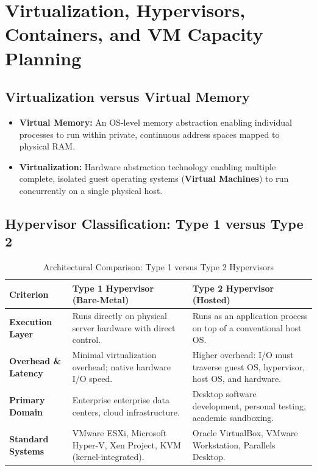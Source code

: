 \section{Virtualization, Hypervisors, Containers, and VM Capacity Planning}
\label{sec:os_virtualization_capacity}

\subsection{Virtualization versus Virtual Memory}
\begin{itemize}
    \item \textbf{Virtual Memory:} An OS-level memory abstraction enabling individual processes to run within private, continuous address spaces mapped to physical RAM.
    \item \textbf{Virtualization:} Hardware abstraction technology enabling multiple complete, isolated guest operating systems (\textbf{Virtual Machines}) to run concurrently on a single physical host.
\end{itemize}

\subsection{Hypervisor Classification: Type 1 versus Type 2}
\begin{table}[htbp]
\centering
\small
\caption{Architectural Comparison: Type 1 versus Type 2 Hypervisors}
\label{tab:hypervisor_comparison}
\begin{tabularx}{\textwidth}{p{3.2cm} X X}
\toprule
\textbf{Criterion} & \textbf{Type 1 Hypervisor (Bare-Metal)} & \textbf{Type 2 Hypervisor (Hosted)} \\
\midrule
\textbf{Execution Layer} & Runs directly on physical server hardware with direct control. & Runs as an application process on top of a conventional host OS. \\
\textbf{Overhead \& Latency} & Minimal virtualization overhead; native hardware I/O speed. & Higher overhead: I/O must traverse guest OS, hypervisor, host OS, and hardware. \\
\textbf{Primary Domain} & Enterprise enterprise data centers, cloud infrastructure. & Desktop software development, personal testing, academic sandboxing. \\
\textbf{Standard Systems} & VMware ESXi, Microsoft Hyper-V, Xen Project, KVM (kernel-integrated). & Oracle VirtualBox, VMware Workstation, Parallels Desktop. \\
\bottomrule
\end{tabularx}
\end{table}

